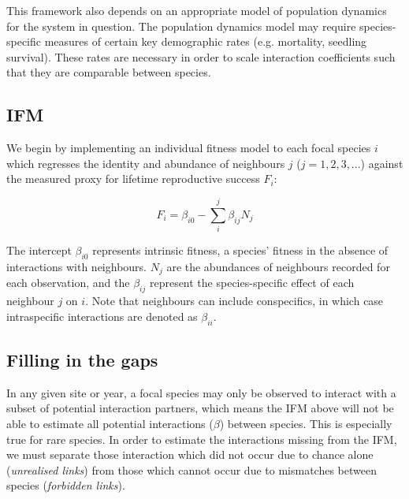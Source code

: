 \documentclass[a4,12pt]{article}
\begin{document}
    
    This framework also depends on an appropriate model of population dynamics for the system in question. The population dynamics model may require species-specific measures of certain key demographic rates (e.g. mortality, seedling survival). These rates are necessary in order to scale interaction coefficients such that they are comparable between species. 
    
    
        \subsection{IFM}
        
        We begin by implementing an individual fitness model to each focal species $i$ which regresses the identity and abundance of neighbours $j$ ($j = 1, 2, 3, ...$) against the measured proxy for lifetime reproductive success $F_{i}$:
        
        \begin{equation}
        F_{i} = \beta_{i0} - \sum_{i}^{j} \beta_{ij} N_{j}
        \label{ifm}
        \end{equation}
        
        The intercept $\beta_{i0}$ represents intrinsic fitness, a species' fitness in the absence of interactions with neighbours. $N_{j}$ are the abundances of neighbours recorded for each observation, and the $\beta_{ij}$ represent the species-specific effect of each neighbour $j$ on $i$. Note that neighbours can include conspecifics, in which case intraspecific interactions are denoted as $\beta_{ii}$.
        
        
        \subsection{Filling in the gaps}
        
        In any given site or year, a focal species may only be observed to interact with a subset of potential interaction partners, which means the IFM above will not be able to estimate all potential interactions ($\beta$) between species. This is especially true for rare species. In order to estimate the interactions missing from the IFM, we must separate those interaction which did not occur due to chance alone (\textit{unrealised links}) from those which cannot occur due to mismatches between species (\textit{forbidden links}). 
        
        
\end{document}
